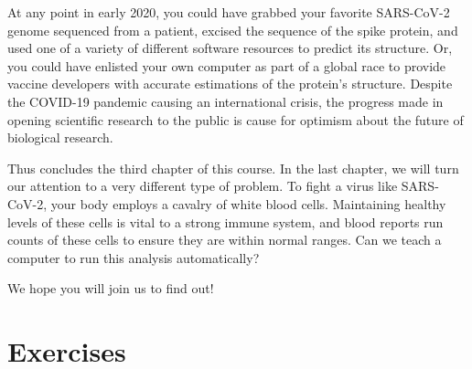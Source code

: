 At any point in early 2020, you could have grabbed your favorite SARS-CoV-2 genome sequenced from a patient, excised the sequence of the spike protein, and used one of a variety of different software resources to predict its structure. Or, you could have enlisted your own computer as part of a global race to provide vaccine developers with accurate estimations of the protein's structure. Despite the COVID-19 pandemic causing an international crisis, the progress made in opening scientific research to the public is cause for optimism about the future of biological research.

Thus concludes the third chapter of this course. In the last chapter, we will turn our attention to a very different type of problem. To fight a virus like SARS-CoV-2, your body employs a cavalry of white blood cells. Maintaining healthy levels of these cells is vital to a strong immune system, and blood reports run counts of these cells to ensure they are within normal ranges. Can we teach a computer to run this analysis automatically?

We hope you will join us to find out!

\begin{note}\end{note}

\FloatBarrier
\section{Exercises}
\label{sec:coronavirus_exercises}

\begin{exercise}\end{exercise}
